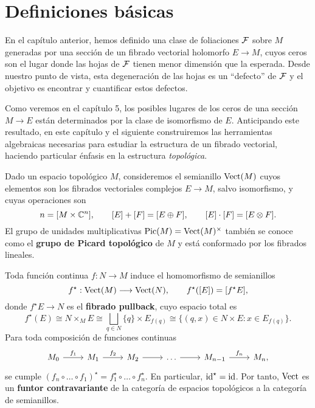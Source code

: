 \section{Definiciones básicas}

En el capítulo anterior, hemos definido una clase de foliaciones $\mathcal F$ sobre $M$ generadas por una sección de un fibrado vectorial holomorfo $E \to M$, cuyos ceros son el lugar donde las hojas de $\mathcal F$ tienen menor dimensión que la esperada. Desde nuestro punto de vista, esta degeneración de las hojas es un ``defecto'' de $\mathcal F$ y el objetivo es encontrar y cuantificar estos defectos.

Como veremos en el capítulo 5, los posibles lugares de los ceros de una sección $M \to E$ están determinados por la clase de isomorfismo de $E$. Anticipando este resultado, en este capítulo y el siguiente construiremos las herramientas algebraicas necesarias para estudiar la estructura de un fibrado vectorial, haciendo particular énfasis en la estructura \textit{topológica}.

Dado un espacio topológico $M$, consideremos el semianillo $\operatorname{Vect}(M)$ cuyos elementos son los fibrados vectoriales complejos $E \to M$, salvo isomorfismo, y cuyas operaciones son
$$n = [M \times \mathbb C^n], \qquad [E] + [F] = [E \oplus F], \qquad [E] \cdot [F] = [E \otimes F].$$
El grupo de unidades multiplicativas $\operatorname{Pic}(M) = \operatorname{Vect}(M)^\times$ también se conoce como el \textbf{grupo de Picard topológico} de $M$ y está conformado por los fibrados lineales.

Toda función continua $f : N \to M$ induce el homomorfismo de semianillos
$$f^\star : \operatorname{Vect}(M) \longrightarrow \operatorname{Vect}(N), \qquad f^\star([E]) = [f^\star E],$$
donde $f^\star E \to N$ es el \textbf{fibrado pullback}, cuyo espacio total es
$$
f^\star(E)
    \cong N \times_M E
    \cong \bigsqcup_{q \in N} \{ q \} \times E_{f(q)}
    \cong \Big \{ (q,x) \in N \times E : x \in E_{f(q)} \Big \}.
$$
Para toda composición de funciones continuas
$$
\begin{tikzcd}
    M_0     \arrow[r, "f_1"] &
    M_1     \arrow[r, "f_2"] &
    M_2     \arrow[r] &
    \dots   \arrow[r] &
    M_{n-1} \arrow[r, "f_n"] &
    M_n,
\end{tikzcd}
$$
se cumple $(f_n \circ \dots \circ f_1)^\star = f_1^\star \circ \dots \circ f_n^\star$. En particular, $\operatorname{id}^\star = \operatorname{id}$. Por tanto, $\operatorname{Vect}$ es un \textbf{funtor contravariante} de la categoría de espacios topológicos a la categoría de semianillos.
